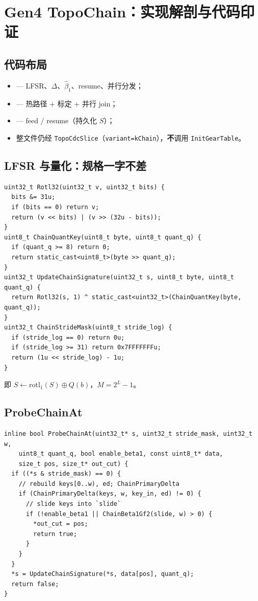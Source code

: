 \chapter{Gen4 TopoChain：实现解剖与代码印证}
\label{ch:gen4-impl}

\section{代码布局}

\begin{itemize}[nosep]
  \item {} — LFSR、$\Delta$、$\hat\beta_1$、resume、并行分发；
  \item {} — 热路径 + 标定 + 并行 join；
  \item {} — feed / resume（持久化 $S$）；
  \item 整文件仍经 \texttt{TopoCdcSlice}（\texttt{variant=kChain}），\textbf{不}调用 \texttt{InitGearTable}。
\end{itemize}

\section{LFSR 与量化：规格一字不差}

\begin{lstlisting}[caption={XOR-LFSR（\filepath{topo\_chain\_scan.cc}）},label={lst:chain-lfsr}]
uint32_t Rotl32(uint32_t v, uint32_t bits) {
  bits &= 31u;
  if (bits == 0) return v;
  return (v << bits) | (v >> (32u - bits));
}
uint8_t ChainQuantKey(uint8_t byte, uint8_t quant_q) {
  if (quant_q >= 8) return 0;
  return static_cast<uint8_t>(byte >> quant_q);
}
uint32_t UpdateChainSignature(uint32_t s, uint8_t byte, uint8_t quant_q) {
  return Rotl32(s, 1) ^ static_cast<uint32_t>(ChainQuantKey(byte, quant_q));
}
uint32_t ChainStrideMask(uint8_t stride_log) {
  if (stride_log == 0) return 0u;
  if (stride_log >= 31) return 0x7FFFFFFFu;
  return (1u << stride_log) - 1u;
}
\end{lstlisting}

即 $S\leftarrow\mathrm{rotl}_1(S)\oplus Q(b)$，$M=2^L-1$。

\section{ProbeChainAt}

\begin{lstlisting}[caption={stride 命中才做拓扑},label={lst:probe-chain}]
inline bool ProbeChainAt(uint32_t* s, uint32_t stride_mask, uint32_t w,
    uint8_t quant_q, bool enable_beta1, const uint8_t* data,
    size_t pos, size_t* out_cut) {
  if ((*s & stride_mask) == 0) {
    // rebuild keys[0..w), ed; ChainPrimaryDelta
    if (ChainPrimaryDelta(keys, w, key_in, ed) != 0) {
      // slide keys into `slide`
      if (!enable_beta1 || ChainBeta1Gf2(slide, w) > 0) {
        *out_cut = pos;
        return true;
      }
    }
  }
  *s = UpdateChainSignature(*s, data[pos], quant_q);
  return false;
}
\end{lstlisting}

